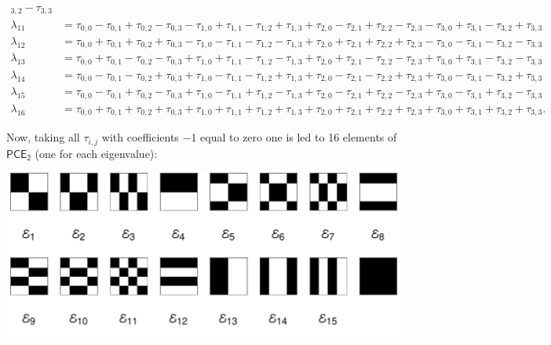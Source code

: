 \documentclass[11pt,dvipsnames]{article} %
\newcommand{\1}{\mathds{1}}
\newcommand{\PCE}[1]{\mathsf{PCE}_\mathsf{#1}}
\begin{document}
\begin{align}
   _{3,2}-\tau _{3,3}\nonumber \\
\lambda_{11}&=   
 \tau _{0,0}-\tau _{0,1}+\tau _{0,2}-\tau _{0,3}-\tau _{1,0}+\tau _{1,1}-\tau _{1,2}+\tau
   _{1,3}+\tau _{2,0}-\tau _{2,1}+\tau _{2,2}-\tau _{2,3}-\tau _{3,0}+\tau _{3,1}-\tau
   _{3,2}+\tau _{3,3}\nonumber \\
\lambda_{12}&=   
 \tau _{0,0}+\tau _{0,1}+\tau _{0,2}+\tau _{0,3}-\tau _{1,0}-\tau _{1,1}-\tau _{1,2}-\tau
   _{1,3}+\tau _{2,0}+\tau _{2,1}+\tau _{2,2}+\tau _{2,3}-\tau _{3,0}-\tau _{3,1}-\tau
   _{3,2}-\tau _{3,3}\nonumber \\
\lambda_{13}&=   
 \tau _{0,0}+\tau _{0,1}-\tau _{0,2}-\tau _{0,3}+\tau _{1,0}+\tau _{1,1}-\tau _{1,2}-\tau
   _{1,3}+\tau _{2,0}+\tau _{2,1}-\tau _{2,2}-\tau _{2,3}+\tau _{3,0}+\tau _{3,1}-\tau
   _{3,2}-\tau _{3,3}\nonumber \\
\lambda_{14}&=   
 \tau _{0,0}-\tau _{0,1}-\tau _{0,2}+\tau _{0,3}+\tau _{1,0}-\tau _{1,1}-\tau _{1,2}+\tau
   _{1,3}+\tau _{2,0}-\tau _{2,1}-\tau _{2,2}+\tau _{2,3}+\tau _{3,0}-\tau _{3,1}-\tau
   _{3,2}+\tau _{3,3}\nonumber \\
\lambda_{15}&=   
 \tau _{0,0}-\tau _{0,1}+\tau _{0,2}-\tau _{0,3}+\tau _{1,0}-\tau _{1,1}+\tau _{1,2}-\tau
   _{1,3}+\tau _{2,0}-\tau _{2,1}+\tau _{2,2}-\tau _{2,3}+\tau _{3,0}-\tau _{3,1}+\tau
   _{3,2}-\tau _{3,3}\nonumber \\
\lambda_{16}&=  
 \tau _{0,0}+\tau _{0,1}+\tau _{0,2}+\tau _{0,3}+\tau _{1,0}+\tau _{1,1}+\tau _{1,2}+\tau
   _{1,3}+\tau _{2,0}+\tau _{2,1}+\tau _{2,2}+\tau _{2,3}+\tau _{3,0}+\tau _{3,1}+\tau
   _{3,2}+\tau _{3,3}. 
\end{align}

Now, taking all $\tau_{i,j}$ with coefficients $-1$ equal to zero 
one is led to 16 elements of $\PCE{2}$ (one for each eigenvalue): \newline

\includegraphics[width=\textwidth]{2Q-fundamentals}
\end{document}
